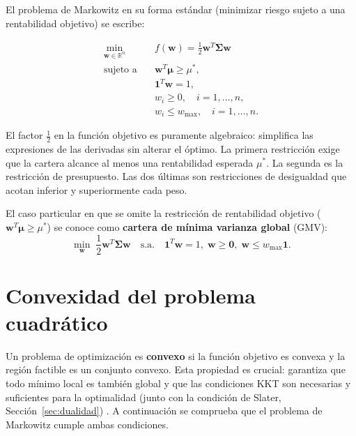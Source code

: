 El problema de Markowitz en su forma estándar (minimizar riesgo sujeto a
una rentabilidad objetivo) se escribe:

\begin{equation}
    \boxed{
    \begin{aligned}
        \min_{\mathbf{w} \in \mathbb{R}^n} \quad
        & f(\mathbf{w}) = \frac{1}{2} \mathbf{w}^T \boldsymbol{\Sigma}
          \mathbf{w} \\
        \text{sujeto a} \quad
        & \mathbf{w}^T \boldsymbol{\mu} \ge \mu^*, \\
        & \mathbf{1}^T \mathbf{w} = 1, \\
        & w_i \ge 0, \quad i = 1, \dots, n, \\
        & w_i \le w_{\max}, \quad i = 1, \dots, n.
    \end{aligned}}
    \label{eq:qp-completo}
\end{equation}

El factor $\frac{1}{2}$ en la función objetivo es puramente algebraico:
simplifica las expresiones de las derivadas sin alterar el óptimo.
La primera restricción exige que la cartera alcance al menos una
rentabilidad esperada $\mu^*$. La segunda es la restricción de
presupuesto. Las dos últimas son restricciones de desigualdad que
acotan inferior y superiormente cada peso.

El caso particular en que se omite la restricción de rentabilidad objetivo
($\mathbf{w}^T \boldsymbol{\mu} \ge \mu^*$) se conoce como \textbf{cartera
de mínima varianza global} (GMV):
\begin{equation}
    \min_{\mathbf{w}} \;
    \frac{1}{2} \mathbf{w}^T \boldsymbol{\Sigma} \mathbf{w}
    \quad \text{s.a.} \quad
    \mathbf{1}^T \mathbf{w} = 1, \;
    \mathbf{w} \ge \mathbf{0}, \;
    \mathbf{w} \le w_{\max} \mathbf{1}.
    \label{eq:gmv-formal}
\end{equation}

\section{Convexidad del problema cuadrático}

Un problema de optimización es \textbf{convexo} si la función objetivo es
convexa y la región factible es un conjunto convexo. Esta propiedad es crucial:
garantiza que todo mínimo local es también global y que las condiciones KKT son
necesarias y suficientes para la optimalidad (junto con la condición de Slater,
Sección~\ref{sec:dualidad}) \cite{Boyd2004}. A continuación se
comprueba que el problema de Markowitz cumple ambas condiciones.

